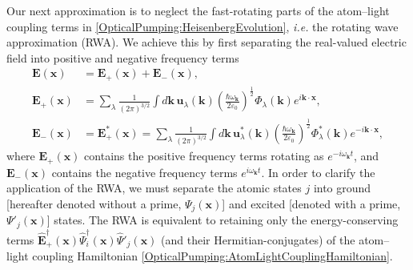 Our next approximation is to neglect the fast-rotating parts of the atom--light coupling terms in \eqref{OpticalPumping:HeisenbergEvolution}, \emph{i.e.} the rotating wave approximation (RWA).  We achieve this by first separating the real-valued electric field into positive and negative frequency terms
\begin{align}
    \bm{E}(\bm{x}) &= \bm{E}_+(\bm{x}) + \bm{E}_-(\bm{x}), \\
    \bm{E}_+(\bm{x}) &= \sum_\lambda \frac{1}{(2\pi)^{3/2}} \int d \bm{k}\, \bm{u}_\lambda(\bm{k}) \left(\frac{\hbar \omega_{\bm{k}}}{2 \varepsilon_0}\right)^{\frac{1}{2}} \Phi_\lambda(\bm{k}) e^{i \bm{k} \cdot \bm{x}},\\
    \bm{E}^{\phantom{*}}_-(\bm{x}) &= \bm{E}_+^*(\bm{x}) = \sum_\lambda \frac{1}{(2\pi)^{3/2}} \int d \bm{k}\, \bm{u}^*_\lambda(\bm{k}) \left(\frac{\hbar \omega_{\bm{k}}}{2 \varepsilon_0}\right)^{\frac{1}{2}} \Phi^*_\lambda(\bm{k}) e^{-i \bm{k} \cdot \bm{x}},
\end{align}
where $\bm{E}_+(\bm{x})$ contains the positive frequency terms rotating as $e^{-i \omega_{\bm{k}} t}$, and $\bm{E}_-(\bm{x})$ contains the negative frequency terms $e^{i \omega_{\bm{k}} t}$.  In order to clarify the application of the RWA, we must separate the atomic states $j$ into ground [hereafter denoted without a prime, $\Psi_j(\bm{x})$] and excited [denoted with a prime, $\Psi'_j(\bm{x})$] states.  The RWA is equivalent to retaining only the energy-conserving terms $\hat{\bm{E}}_+^\dagger(\bm{x})\hat{\Psi}_i^\dagger(\bm{x}) \hat{\Psi}'_j(\bm{x})$ (and their Hermitian-conjugates) of the atom--light coupling Hamiltonian \eqref{OpticalPumping:AtomLightCouplingHamiltonian}.  

